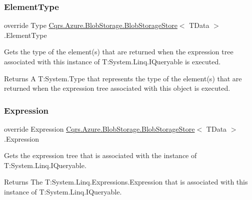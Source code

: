 \subsubsection{\texorpdfstring{Element\+Type}{ElementType}}
{\footnotesize\ttfamily override Type \hyperlink{classCqrs_1_1Azure_1_1BlobStorage_1_1BlobStorageStore}{Cqrs.\+Azure.\+Blob\+Storage.\+Blob\+Storage\+Store}$<$ T\+Data $>$.Element\+Type\hspace{0.3cm}{\ttfamily [get]}}



Gets the type of the element(s) that are returned when the expression tree associated with this instance of T\+:\+System.\+Linq.\+I\+Queryable is executed. 

\begin{DoxyReturn}{Returns}
A T\+:\+System.\+Type that represents the type of the element(s) that are returned when the expression tree associated with this object is executed. 
\end{DoxyReturn}
\mbox{\label{classCqrs_1_1Azure_1_1BlobStorage_1_1BlobStorageStore_a8b3be7237234e7de532fccbfa6bbade8_a8b3be7237234e7de532fccbfa6bbade8}} 
\subsubsection{\texorpdfstring{Expression}{Expression}}
{\footnotesize\ttfamily override Expression \hyperlink{classCqrs_1_1Azure_1_1BlobStorage_1_1BlobStorageStore}{Cqrs.\+Azure.\+Blob\+Storage.\+Blob\+Storage\+Store}$<$ T\+Data $>$.Expression\hspace{0.3cm}{\ttfamily [get]}}



Gets the expression tree that is associated with the instance of T\+:\+System.\+Linq.\+I\+Queryable. 

\begin{DoxyReturn}{Returns}
The T\+:\+System.\+Linq.\+Expressions.\+Expression that is associated with this instance of T\+:\+System.\+Linq.\+I\+Queryable. 
\end{DoxyReturn}
\mbox{\label{classCqrs_1_1Azure_1_1BlobStorage_1_1BlobStorageStore_acbc7f5a9d6eb9d1ece9a9035f185d4bf_acbc7f5a9d6eb9d1ece9a9035f185d4bf}} 
